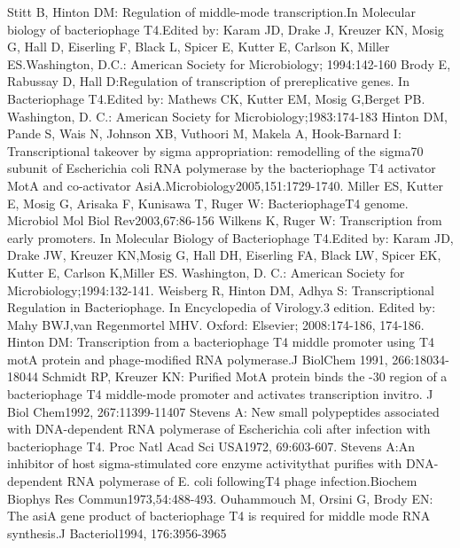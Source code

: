 \documentclass[a4paper,12pt]{article}
\begin{document}
\newpage
\begin{thebibliography}{9}
     Stitt B, Hinton DM: Regulation of middle-mode transcription.In Molecular biology  of  bacteriophage  T4.Edited by: Karam JD, Drake J, Kreuzer KN, Mosig G, Hall D, Eiserling F, Black L, Spicer E, Kutter E, Carlson K, Miller ES.Washington, D.C.: American Society for Microbiology; 1994:142-160
     Brody E, Rabussay D, Hall D:Regulation of transcription of prereplicative genes. In Bacteriophage  T4.Edited by: Mathews CK, Kutter EM, Mosig G,Berget PB. Washington, D. C.: American Society for Microbiology;1983:174-183
     Hinton DM, Pande S, Wais N, Johnson XB, Vuthoori M, Makela A, Hook-Barnard I: Transcriptional takeover by sigma appropriation: remodelling of the sigma70 subunit of Escherichia coli RNA polymerase by the bacteriophage T4 activator MotA and co-activator AsiA.Microbiology2005,151:1729-1740.
     Miller ES, Kutter E, Mosig G, Arisaka F, Kunisawa T, Ruger W: BacteriophageT4 genome. Microbiol  Mol  Biol  Rev2003,67:86-156
     Wilkens K, Ruger W: Transcription from early promoters. In Molecular Biology  of  Bacteriophage  T4.Edited by: Karam JD, Drake JW, Kreuzer KN,Mosig G, Hall DH, Eiserling FA, Black LW, Spicer EK, Kutter E, Carlson K,Miller ES. Washington, D. C.: American Society for Microbiology;1994:132-141.
     Weisberg R, Hinton DM, Adhya S: Transcriptional Regulation in Bacteriophage. In Encyclopedia  of  Virology.3 edition. Edited by: Mahy BWJ,van Regenmortel MHV. Oxford: Elsevier; 2008:174-186, 174-186.
     Hinton DM: Transcription from a bacteriophage T4 middle promoter using T4 motA protein and phage-modified RNA polymerase.J  BiolChem 1991, 266:18034-18044
     Schmidt RP, Kreuzer KN: Purified MotA protein binds the -30 region of a bacteriophage T4 middle-mode promoter and activates transcription invitro. J  Biol  Chem1992, 267:11399-11407
     Stevens A: New small polypeptides associated with DNA-dependent RNA polymerase of Escherichia coli after infection with bacteriophage T4. Proc  Natl  Acad  Sci  USA1972, 69:603-607.
     Stevens A:An inhibitor of host sigma-stimulated core enzyme activitythat purifies with DNA-dependent RNA polymerase of E. coli followingT4 phage infection.Biochem  Biophys  Res  Commun1973,54:488-493.
     Ouhammouch M, Orsini G, Brody EN: The asiA gene product of bacteriophage T4 is required for middle mode RNA synthesis.J  Bacteriol1994, 176:3956-3965

\end{thebibliography}
\end{document}
